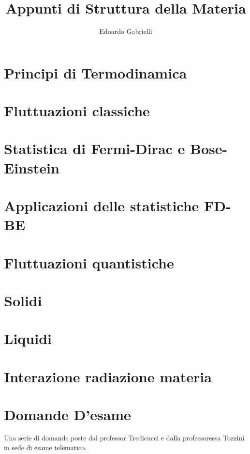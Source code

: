 

\author{Edoardo Gabrielli}
\title{Appunti di Struttura della Materia}


\maketitle
\clearpage
\tableofcontents
\clearpage
\chapter{Principi di Termodinamica}






\chapter{Fluttuazioni classiche}

\chapter{Statistica di Fermi-Dirac e Bose-Einstein}




\chapter{Applicazioni delle statistiche FD-BE}





\chapter{Fluttuazioni quantistiche}


\chapter{Solidi}



\chapter{Liquidi}






\chapter{Interazione radiazione materia}



 
\chapter{Domande D'esame}
Una serie di domande poste dal professor Tredicucci e dalla professoressa Tozzini in sede di esame telematico.
 

